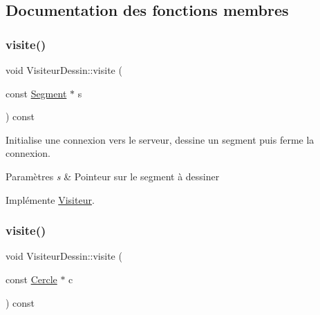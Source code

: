\subsection{Documentation des fonctions membres}
\mbox{\label{class_visiteur_dessin_a39d12a331fcc80c183fc706cdb2d394a}} 
\subsubsection{\texorpdfstring{visite()}{visite()}\hspace{0.1cm}{\footnotesize\ttfamily [1/5]}}
{\footnotesize\ttfamily void Visiteur\+Dessin\+::visite (\begin{DoxyParamCaption}\item[{const \mbox{\hyperlink{class_segment}{Segment}} $\ast$}]{s }\end{DoxyParamCaption}) const\hspace{0.3cm}{\ttfamily [virtual]}}



Initialise une connexion vers le serveur, dessine un segment puis ferme la connexion. 


\begin{DoxyParams}{Paramètres}
{\em s} & Pointeur sur le segment à dessiner \\
\hline
\end{DoxyParams}


Implémente \mbox{\hyperlink{class_visiteur_ab63ea127a0ac3cfa12c4cbdd9d9c8eb2}{Visiteur}}.

\mbox{\label{class_visiteur_dessin_ab757769d7c4bf7eac6263eecc8554896}} 
\subsubsection{\texorpdfstring{visite()}{visite()}\hspace{0.1cm}{\footnotesize\ttfamily [2/5]}}
{\footnotesize\ttfamily void Visiteur\+Dessin\+::visite (\begin{DoxyParamCaption}\item[{const \mbox{\hyperlink{class_cercle}{Cercle}} $\ast$}]{c }\end{DoxyParamCaption}) const\hspace{0.3cm}{\ttfamily [virtual]}}



